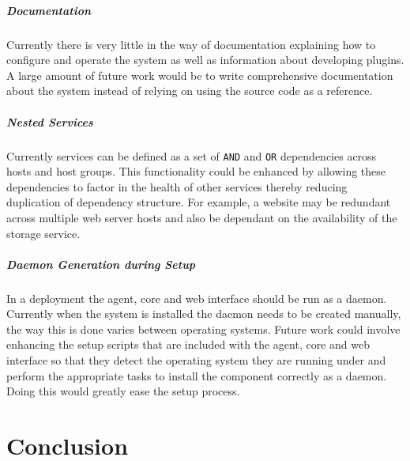 \documentclass[bsc,deptreport,twoside,parskip,singlespacing,notimes]{infthesis}
\begin{document}
\paragraph*{Documentation}
	Currently there is very little in the way of documentation explaining how to
	configure and operate the system as well as information about developing
	plugins.  A large amount of future work would be to write comprehensive
	documentation about the system instead of relying on using the source code as a
	reference.

\paragraph*{Nested Services}
	Currently services can be defined as a set of \texttt{AND} and \texttt{OR}
	dependencies across hosts and host groups.  This functionality could be
 	enhanced by allowing these dependencies to factor in the health of other
 	services thereby reducing duplication of dependency structure.  For example,
 	a website may be redundant across multiple web server hosts and also be
 	dependant on the availability of the storage service.

\paragraph*{Daemon Generation during Setup}
	In a deployment the agent, core and web interface should be run as a daemon.
	Currently when the system is installed the daemon needs to be created manually,
	the way this is done varies between operating systems. Future work could
	involve enhancing the setup scripts that are included with the agent, core and
	web interface so that they detect the operating system they are running under
	and perform the appropriate tasks to install the component correctly as a
	daemon.  Doing this would greatly ease the setup process.


\chapter{Conclusion}
\end{document}
